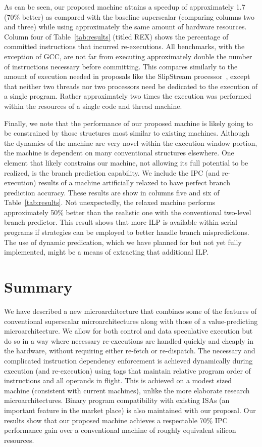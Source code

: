 \documentclass[10pt,dvips]{article}
\begin{document}
%
As can be seen, our proposed machine attains a speedup of approximately
1.7 (70\% better) as compared with the baseline superscalar 
(comparing columns two and three) 
while using approximately the same amount of hardware resources.
Column four of Table~\ref{tab:results} (titled REX) shows the percentage
of committed instructions that incurred re-executions.
All benchmarks, with the exception of GCC, are not far
from executing approximately double the number of instructions
necessary before committing.
This compares similarly to the amount of execution needed
in proposals like the SlipStream processor~\cite{ibrahim03},
except that neither two threads nor two processors need be
dedicated to the execution of a single program. 
Rather approximately two times the execution was performed
within the resources of a single code and thread machine.

Finally, we note that the performance of our proposed machine
is likely going to be constrained by those structures most
similar to existing machines.  Although the dynamics of
the machine are very novel within the execution window portion,
the machine is dependent on many conventional structures elsewhere.
One element that likely constrains our machine, not allowing its
full potential to be realized, is the branch prediction
capability.  We include the IPC (and re-execution) results of a
machine artificially relaxed to have perfect branch prediction
accuracy.  These results are show in columns five and six of
Table~\ref{tab:results}.  Not unexpectedly, the relaxed machine performs
approximately 50\% better than the realistic one with the
conventional two-level branch predictor.
This result shows that more ILP is available within serial programs
if strategies can be employed to better handle branch mispredictions.
The use of dynamic predication, which we have planned for but not
yet fully implemented, might be a means of extracting that additional
ILP.
%
%
\vspace{-0.15in}
\section{Summary}
%
We have described a new microarchitecture that combines
some of the features of conventional superscalar microarchitectures
along with those of a value-predicting microarchitecture.
We allow for both control and data speculative execution
but do so in a way where necessary re-executions are handled
quickly and cheaply in the hardware, without requiring either
re-fetch or re-dispatch.  
The necessary and complicated instruction dependency
enforcement is achieved dynamically during execution (and re-execution)
using tags that maintain relative program order
of instructions and all operands in flight.
This is achieved on a modest sized machine (consistent with current
machines), unlike the more
elaborate research microarchitectures.
Binary program compatibility with existing ISAs (an important feature
in the market place) is also maintained with our proposal.
Our results show that our proposed machine achieves a respectable
70\% IPC performance gain over a conventional machine of roughly
equivalent silicon resources.
\end{document}
